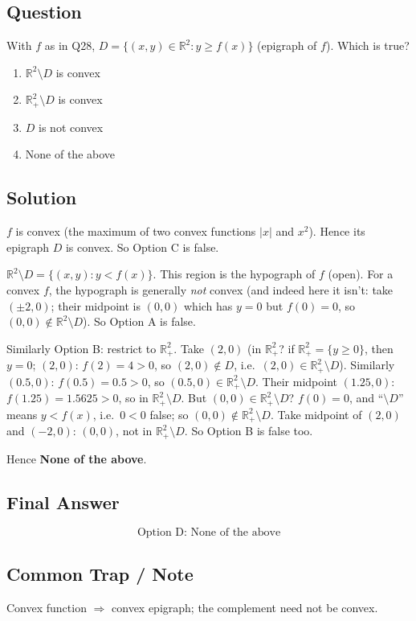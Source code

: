 \documentclass[11pt]{article}
\begin{document}
\subsection*{Question}
With $f$ as in Q28, $D=\{(x,y)\in\mathbb R^2:y\ge f(x)\}$ (epigraph of $f$). Which is true?
\begin{enumerate}[label=(\Alph*)]
\item $\mathbb R^2\setminus D$ is convex \item $\mathbb R^2_+\setminus D$ is convex \item $D$ is not convex \item None of the above
\end{enumerate}

\subsection*{Solution}
$f$ is convex (the maximum of two convex functions $|x|$ and $x^2$). Hence its epigraph $D$ is convex. So Option C is false.

$\mathbb R^2\setminus D=\{(x,y):y<f(x)\}$. This region is the hypograph of $f$ (open). For a convex $f$, the hypograph is generally \emph{not} convex (and indeed here it isn't: take $(\pm 2,0)$; their midpoint is $(0,0)$ which has $y=0$ but $f(0)=0$, so $(0,0)\notin\mathbb R^2\setminus D$). So Option A is false.

Similarly Option B: restrict to $\mathbb R^2_+$. Take $(2,0)$ (in $\mathbb R^2_+$? if $\mathbb R^2_+=\{y\ge 0\}$, then $y=0$; $(2,0)$: $f(2)=4>0$, so $(2,0)\notin D$, i.e.\ $(2,0)\in\mathbb R^2_+\setminus D$). Similarly $(0.5,0)$: $f(0.5)=0.5>0$, so $(0.5,0)\in\mathbb R^2_+\setminus D$. Their midpoint $(1.25,0)$: $f(1.25)=1.5625>0$, so in $\mathbb R^2_+\setminus D$. But $(0,0)\in\mathbb R^2_+\setminus D$? $f(0)=0$, and ``$\setminus D$'' means $y<f(x)$, i.e.\ $0<0$ false; so $(0,0)\notin\mathbb R^2_+\setminus D$. Take midpoint of $(2,0)$ and $(-2,0)$: $(0,0)$, not in $\mathbb R^2_+\setminus D$. So Option B is false too.

Hence \textbf{None of the above}.

\subsection*{Final Answer}
\[
\boxed{\text{Option D: None of the above}}
\]

\subsection*{Common Trap / Note}
Convex function $\Rightarrow$ convex epigraph; the complement need not be convex.
\end{document}
